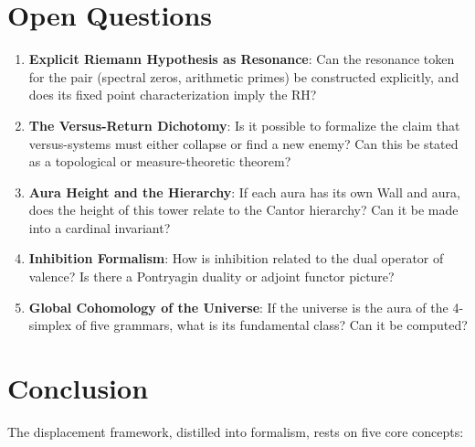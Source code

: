 \documentclass[12pt]{article}
\theoremstyle{definition}
\theoremstyle{remark}
\begin{document}
\section{Open Questions}

\begin{enumerate}
\item \textbf{Explicit Riemann Hypothesis as Resonance}: Can the resonance token for the pair (spectral zeros, arithmetic primes) be constructed explicitly, and does its fixed point characterization imply the RH?

\item \textbf{The Versus-Return Dichotomy}: Is it possible to formalize the claim that versus-systems must either collapse or find a new enemy? Can this be stated as a topological or measure-theoretic theorem?

\item \textbf{Aura Height and the Hierarchy}: If each aura has its own Wall and aura, does the height of this tower relate to the Cantor hierarchy? Can it be made into a cardinal invariant?

\item \textbf{Inhibition Formalism}: How is inhibition related to the dual operator of valence? Is there a Pontryagin duality or adjoint functor picture?

\item \textbf{Global Cohomology of the Universe}: If the universe is the aura of the 4-simplex of five grammars, what is its fundamental class? Can it be computed?
\end{enumerate}

\section{Conclusion}

The displacement framework, distilled into formalism, rests on five core concepts:
\end{document}
